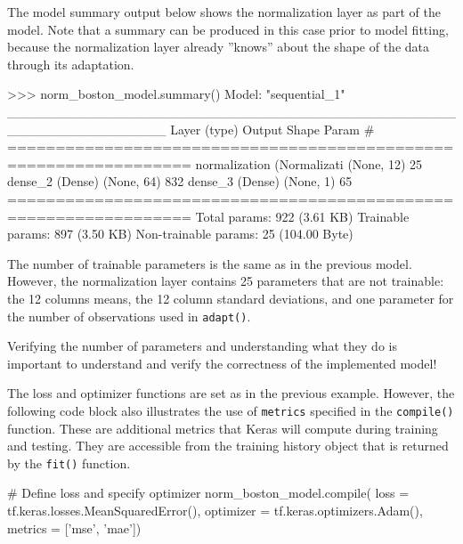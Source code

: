 The model summary output below shows the normalization layer as part of the model. Note that a summary can be produced in this case prior to model fitting, because the normalization layer already ''knows'' about the shape of the data through its adaptation. 

\begin{samepage}
\begin{textcode}
>>> norm_boston_model.summary()
Model: "sequential_1"
_________________________________________________________________
 Layer (type)                Output Shape              Param #   
=================================================================
 normalization (Normalizati  (None, 12)                25        
 dense_2 (Dense)             (None, 64)                832       
 dense_3 (Dense)             (None, 1)                 65        
=================================================================
Total params: 922 (3.61 KB)
Trainable params: 897 (3.50 KB)
Non-trainable params: 25 (104.00 Byte)
\end{textcode}
\end{samepage}

The number of trainable parameters is the same as in the previous model. However, the normalization layer contains 25 parameters that are not trainable: the 12 columns means, the 12 column standard deviations, and one parameter for the number of observations used in \texttt{adapt()}. 

\begin{tcolorbox}[colback=alert]
Verifying the number of parameters and understanding what they do is important to understand and verify the correctness of the implemented model!
\end{tcolorbox}

The loss and optimizer functions are set as in the previous example. However, the following code block also illustrates the use of \texttt{metrics} specified in the \texttt{compile()} function. These are additional metrics that Keras will compute during training and testing. They are accessible from the training history object that is returned by the \texttt{fit()} function.

\begin{samepage}
\begin{pythoncode}
# Define loss and specify optimizer
norm_boston_model.compile(
    loss = tf.keras.losses.MeanSquaredError(),
    optimizer = tf.keras.optimizers.Adam(),
    metrics = ['mse', 'mae'])
\end{pythoncode}
\end{samepage}

